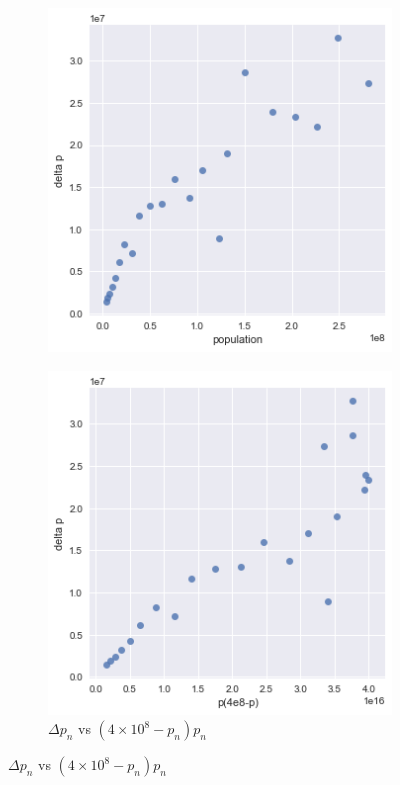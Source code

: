 \documentclass[10pt]{report}
\begin{document}
\begin{enumerate}
\begin{figure}[H]
\begin{subfigure}[b]{.3\linewidth}
			\includegraphics[width=\linewidth]{s1_2/dp-p.png}
		\end{subfigure}
		\begin{subfigure}[b]{.3\linewidth}
			\caption{$\Delta p_n$ vs $(4\times 10^8  - p_n) p_n$}
			\includegraphics[width=\linewidth]{s1_2/dp-(c-p)p.png}

\end{subfigure}
\end{figure}
\end{enumerate}
\end{document}
